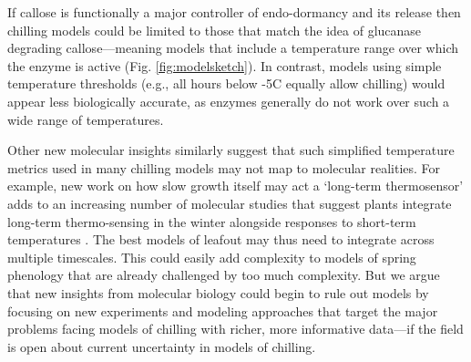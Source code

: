 \documentclass[11pt]{article}
\begin{document}
If callose is functionally a major controller of endo-dormancy and its release then chilling models could be limited to those that match the idea of glucanase degrading callose---meaning models that include a temperature range over which the enzyme is active (Fig. \ref{fig:modelsketch}). In contrast, models using simple temperature thresholds (e.g., all hours below -5\degree C equally allow chilling) would appear less biologically accurate, as enzymes generally do not work over such a wide range of temperatures. 

Other new molecular insights similarly suggest that such simplified temperature metrics used in many chilling models may not map to molecular realities. For example, new work on how slow growth itself may act  a `long-term thermosensor' \citep{zhao2020temperature} 
adds to an increasing number of molecular studies that suggest plants integrate long-term thermo-sensing in the winter alongside responses to short-term temperatures \citep{antoniou2021feeling,Satake2022}. The best models of leafout may thus need to integrate across multiple timescales. This could easily add complexity to models of spring phenology that are already challenged by too much complexity. But we argue that new insights from molecular biology could begin to rule out models by focusing on new experiments and modeling approaches that target the major problems facing models of chilling with richer, more informative data---if the field is open about current uncertainty in models of chilling. 


\end{document}
